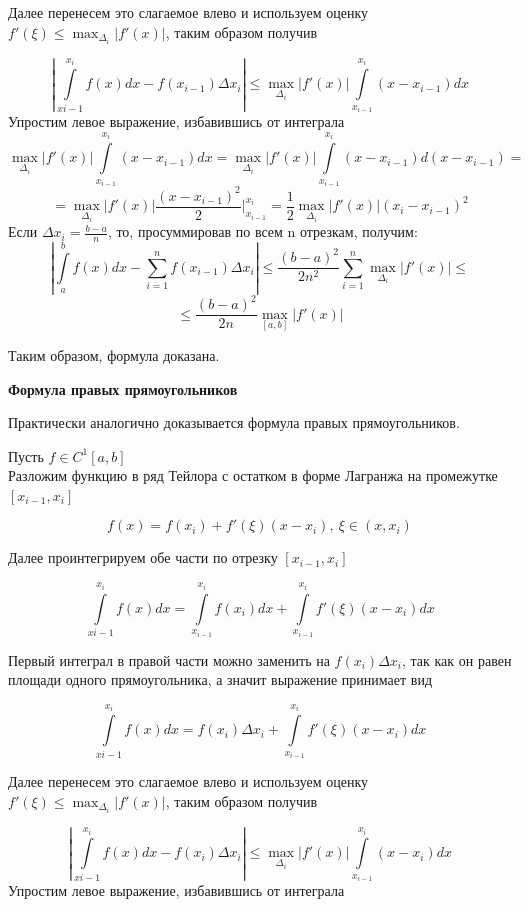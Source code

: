 \documentclass{beamer}
\begin{document}
	Далее перенесем это слагаемое влево и используем оценку $f'(\xi) \leq \max_{\Delta_i} |f'(x)|$, таким образом получив
	
	\[ \left| \int\limits_{x{i-1}}^{x_i} f(x)dx - f(x_{i-1}) \Delta x_i \right| \leq \max_{\Delta_i} |f'(x)| \int\limits_{x_{i-1}}^{x_i} (x - x_{i-1})dx\]
	\newpage
	Упростим левое выражение, избавившись от интеграла
	\[ \max_{\Delta_i} |f'(x)| \int\limits_{x_{i-1}}^{x_i} (x - x_{i-1})dx = \max_{\Delta_i} |f'(x)| \int\limits_{x_{i-1}}^{x_i} (x - x_{i-1})d(x - x_{i-1}) = \]
	\[ = \max_{\Delta_i} |f'(x)| \frac{(x-x_{i-1})^2}{2} \Bigg|_{x_{i-1}}^{x_i} = \frac{1}{2} \max_{\Delta_i} |f'(x)| (x_i - x_{i-1})^2 \]
	\newpage
	Если $ \Delta x_i = \frac{b-a}{n}$, то, просуммировав по всем n отрезкам, получим:\\[1cm]
	\[ \left| \int\limits_{a}^{b} f(x)dx - \sum_{i=1}^{n} f(x_{i-1}) \Delta x_i \right| \leq \frac{(b-a)^2}{2n^2} \sum_{i=1}^{n} \max_{\Delta_i}|f'(x)|\leq\]\[ \leq \frac{(b-a)^2}{2n} \max_{[a, b]}|f'(x)|\]
	
	Таким образом, формула доказана.
	
	\newpage
	
	\textbf{Формула правых прямоугольников}
	
	Практически аналогично доказывается формула правых прямоугольников.
	
	Пусть $f \in C^1[a,b]$ \\ 
	Разложим функцию в ряд Тейлора с остатком в форме Лагранжа на промежутке $[x_{i-1}, x_i]$
	
	\[ f(x) = f(x_i) + f'(\xi)(x - x_i), \ \xi \in (x, x_i)\]
	
	Далее проинтегрируем обе части по отрезку $[x_{i-1}, x_i]$
	
	\[ \int\limits_{x{i-1}}^{x_i} f(x)dx = \int\limits_{x_{i-1}}^{x_i} f(x_i)dx + \int\limits_{x_{i-1}}^{x_i} f'(\xi)(x - x_i)dx\]
	
	Первый интеграл в правой части можно заменить на $f(x_i) \Delta x_i$, так как он равен площади одного прямоугольника, а значит выражение принимает вид 
	
	\[ \int\limits_{x{i-1}}^{x_i} f(x)dx = f(x_i) \Delta x_i + \int\limits_{x_{i-1}}^{x_i} f'(\xi)(x - x_i)dx\]
	
	Далее перенесем это слагаемое влево и используем оценку $f'(\xi) \leq \max_{\Delta_i} |f'(x)|$, таким образом получив
	
	\[ \left| \int\limits_{x{i-1}}^{x_i} f(x)dx - f(x_i) \Delta x_i \right| \leq \max_{\Delta_i} |f'(x)| \int\limits_{x_{i-1}}^{x_i} (x - x_i)dx\]
	\newpage
	Упростим левое выражение, избавившись от интеграла\\[1cm]
\end{document}
